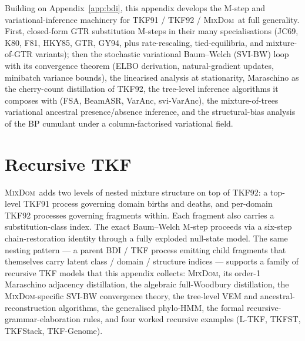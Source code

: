 \documentclass[11pt]{article}
\theoremstyle{remark}
\newcommand{\MixDom}{\textsc{MixDom}}
\numberwithin{equation}{section}
\numberwithin{figure}{section}
\numberwithin{table}{section}
\newcommand\demote{%
  \let\OrigSection\section
  \let\OrigSubsection\subsection
  \let\OrigSubsubsection\subsubsection
  \let\section\subsection
  \let\subsection\subsubsection
  \let\subsubsection\paragraph
}
\newcommand\restore{%
  \let\section\OrigSection
  \let\subsection\OrigSubsection
  \let\subsubsection\OrigSubsubsection
}
\begin{document}
Building on Appendix~\ref{app:bdi}, this appendix develops the
M-step and variational-inference machinery for TKF91 / TKF92 /
\MixDom\ at full generality. First, closed-form GTR substitution
M-steps in their many specialisations (JC69, K80, F81, HKY85, GTR,
GY94, plus rate-rescaling, tied-equilibria, and mixture-of-GTR
variants); then the stochastic variational Baum--Welch (SVI-BW)
loop with its convergence theorem (ELBO derivation,
natural-gradient updates, minibatch variance bounds), the
linearised analysis at stationarity, Maraschino as the cherry-count
distillation of TKF92, the tree-level inference algorithms it
composes with (FSA, BeamASR, VarAnc, svi-VarAnc), the
mixture-of-trees variational ancestral presence/absence inference,
and the structural-bias analysis of the BP cumulant under a
column-factorised variational field.

\demote








\restore

\section{Recursive TKF}
\label{app:recursive}

\MixDom\ adds two levels of nested mixture structure on top of
TKF92: a top-level TKF91 process governing domain births and
deaths, and per-domain TKF92 processes governing fragments
within. Each fragment also carries a substitution-class index.
The exact Baum--Welch M-step proceeds via a six-step
chain-restoration identity through a fully exploded null-state
model. The same nesting pattern --- a parent BDI / TKF process
emitting child fragments that themselves carry latent class /
domain / structure indices --- supports a family of recursive TKF
models that this appendix collects: \MixDom, its order-1 Maraschino
adjacency distillation, the algebraic full-Woodbury distillation,
the \MixDom-specific SVI-BW convergence theory, the tree-level VEM
and ancestral-reconstruction algorithms, the generalised
phylo-HMM, the formal
recursive-grammar-elaboration rules, and four worked recursive
examples (L-TKF, TKFST, TKFStack, TKF-Genome).
\end{document}
